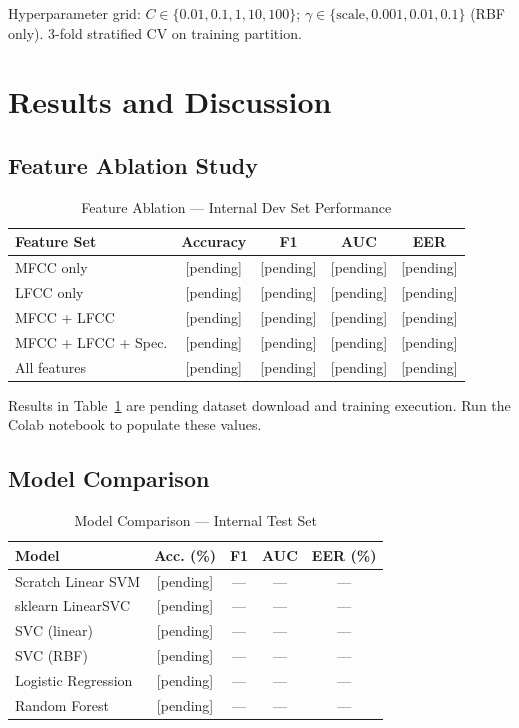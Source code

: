 \documentclass[conference]{IEEEtran}
\begin{document}
Hyperparameter grid: $C \in \{0.01, 0.1, 1, 10, 100\}$;
$\gamma \in \{\text{scale}, 0.001, 0.01, 0.1\}$ (RBF only).
3-fold stratified CV on training partition.

\section{Results and Discussion}
\label{sec:results}

\subsection{Feature Ablation Study}

\begin{table}[htbp]
\caption{Feature Ablation — Internal Dev Set Performance}
\centering
\begin{tabular}{lcccc}
\toprule
Feature Set & Accuracy & F1 & AUC & EER \\
\midrule
MFCC only            & [pending] & [pending] & [pending] & [pending] \\
LFCC only            & [pending] & [pending] & [pending] & [pending] \\
MFCC + LFCC          & [pending] & [pending] & [pending] & [pending] \\
MFCC + LFCC + Spec.  & [pending] & [pending] & [pending] & [pending] \\
All features         & [pending] & [pending] & [pending] & [pending] \\
\bottomrule
\end{tabular}
\label{tab:ablation}
\end{table}

Results in Table~\ref{tab:ablation} are pending dataset download and
training execution. Run the Colab notebook to populate these values.

\subsection{Model Comparison}

\begin{table}[htbp]
\caption{Model Comparison — Internal Test Set}
\centering
\begin{tabular}{lcccc}
\toprule
Model & Acc. (\%) & F1 & AUC & EER (\%) \\
\midrule
Scratch Linear SVM   & [pending] & --- & --- & --- \\
sklearn LinearSVC    & [pending] & --- & --- & --- \\
SVC (linear)         & [pending] & --- & --- & --- \\
SVC (RBF)            & [pending] & --- & --- & --- \\
Logistic Regression  & [pending] & --- & --- & --- \\
Random Forest        & [pending] & --- & --- & --- \\
\bottomrule
\end{tabular}
\label{tab:model_comparison}
\end{table}
\end{document}
